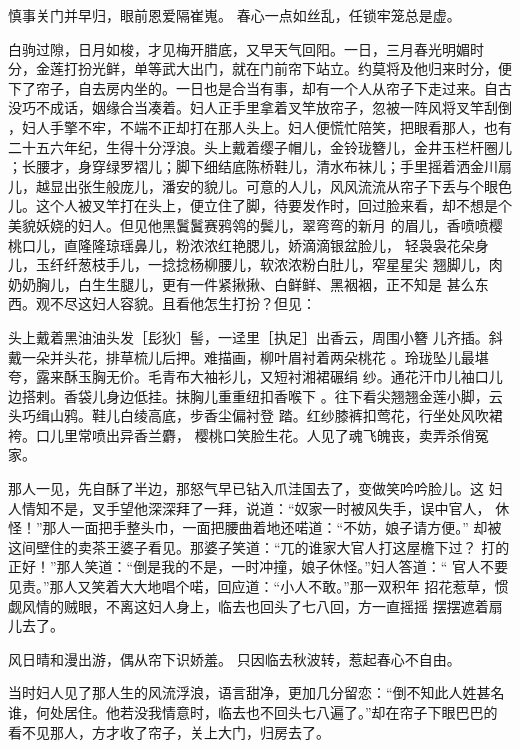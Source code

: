 慎事关门并早归，眼前恩爱隔崔嵬。
春心一点如丝乱，任锁牢笼总是虚。

白驹过隙，日月如梭，才见梅开腊底，又早天气回阳。一日，三月春光明媚时
分，金莲打扮光鲜，单等武大出门，就在门前帘下站立。约莫将及他归来时分，便
下了帘子，自去房内坐的。一日也是合当有事，却有一个人从帘子下走过来。自古
没巧不成话，姻缘合当凑着。妇人正手里拿着叉竿放帘子，忽被一阵风将叉竿刮倒
，妇人手擎不牢，不端不正却打在那人头上。妇人便慌忙陪笑，把眼看那人，也有
二十五六年纪，生得十分浮浪。头上戴着缨子帽儿，金铃珑簪儿，金井玉栏杆圈儿
；长腰才，身穿绿罗褶儿；脚下细结底陈桥鞋儿，清水布袜儿；手里摇着洒金川扇
儿，越显出张生般庞儿，潘安的貌儿。可意的人儿，风风流流从帘子下丢与个眼色
儿。这个人被叉竿打在头上，便立住了脚，待要发作时，回过脸来看，却不想是个
美貌妖娆的妇人。但见他黑鬒鬒赛鸦鸰的鬓儿，翠弯弯的新月
的眉儿，香喷喷樱桃口儿，直隆隆琼瑶鼻儿，粉浓浓红艳腮儿，娇滴滴银盆脸儿，
轻袅袅花朵身儿，玉纤纤葱枝手儿，一捻捻杨柳腰儿，软浓浓粉白肚儿，窄星星尖
翘脚儿，肉奶奶胸儿，白生生腿儿，更有一件紧揪揪、白鲜鲜、黑裀裀，正不知是
甚么东西。观不尽这妇人容貌。且看他怎生打扮？但见：

头上戴着黑油油头发［髟狄］髻，一迳里［执足］出香云，周围小簪
儿齐插。斜戴一朵并头花，排草梳儿后押。难描画，柳叶眉衬着两朵桃花
。玲珑坠儿最堪夸，露来酥玉胸无价。毛青布大袖衫儿，又短衬湘裙碾绢
纱。通花汗巾儿袖口儿边搭剌。香袋儿身边低挂。抹胸儿重重纽扣香喉下
。往下看尖翘翘金莲小脚，云头巧缉山鸦。鞋儿白绫高底，步香尘偏衬登
踏。红纱膝裤扣莺花，行坐处风吹裙袴。口儿里常喷出异香兰麝，
樱桃口笑脸生花。人见了魂飞魄丧，卖弄杀俏冤家。

那人一见，先自酥了半边，那怒气早已钻入爪洼国去了，变做笑吟吟脸儿。这
妇人情知不是，叉手望他深深拜了一拜，说道：“奴家一时被风失手，误中官人，
休怪！”那人一面把手整头巾，一面把腰曲着地还喏道：“不妨，娘子请方便。”
却被这间壁住的卖茶王婆子看见。那婆子笑道：“兀的谁家大官人打这屋檐下过？
打的正好！”那人笑道：“倒是我的不是，一时冲撞，娘子休怪。”妇人答道：“
官人不要见责。”那人又笑着大大地唱个喏，回应道：“小人不敢。”那一双积年
招花惹草，惯觑风情的贼眼，不离这妇人身上，临去也回头了七八回，方一直摇摇
摆摆遮着扇儿去了。

风日晴和漫出游，偶从帘下识娇羞。
只因临去秋波转，惹起春心不自由。

当时妇人见了那人生的风流浮浪，语言甜净，更加几分留恋：“倒不知此人姓甚名
谁，何处居住。他若没我情意时，临去也不回头七八遍了。”却在帘子下眼巴巴的
看不见那人，方才收了帘子，关上大门，归房去了。

